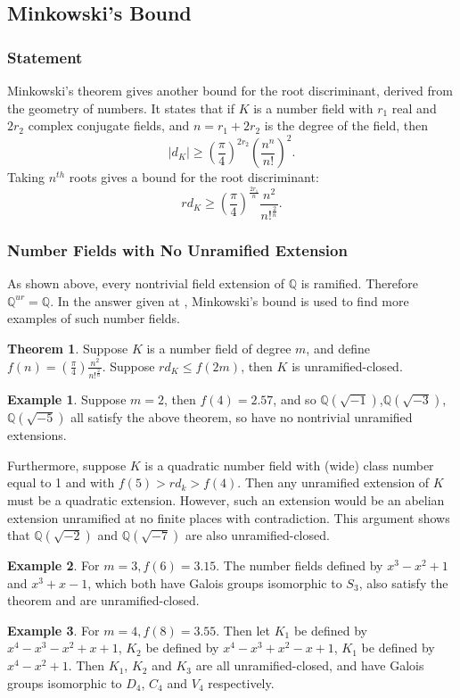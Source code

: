 \documentclass[12pt]{extarticle}
\newcommand{\Q}{\mathbb{Q}}
\newcommand{\<}{\langle}
\renewcommand{\>}{\rangle}
\theoremstyle{definition}
\newtheorem{theorem}{Theorem}
\newtheorem*{example}{Example}
\begin{document}
\subsection{Minkowski's Bound}
\subsubsection*{Statement}
Minkowski's theorem gives another bound for the root discriminant, derived from the geometry of numbers. It states that if $K$ is a number field with $r_1$ real and $2r_2$ complex conjugate fields, and $n=r_1+2r_2$ is the degree of the field, then 
\begin{equation}
|d_K| \geqslant \left( \frac{\pi}{4}\right)^{2r_2} \left( \frac{n^n}{n!}\right)^2.
\end{equation}Taking $n^{th}$ roots gives a bound for the root discriminant:
\begin{equation}
rd_K\geqslant (\frac{\pi}{4})^{\frac{2r_1}{n}}\frac{n^2}{n!^{\frac{2}{n}}}.
\end{equation} 

\subsubsection*{Number Fields with No Unramified Extension}
As shown above, every nontrivial field extension of $\Q$ is ramified. Therefore $\Q^{ur} = \Q$. In the answer given at \cite{CONRAD}, Minkowski's bound is used to find more examples of such number fields.
\begin{theorem}
Suppose $K$ is a number field of degree $m$, and define $f(n) = \left(\frac{\pi}{4}\right) \frac{n^2}{n!^{\frac{2}{n}}}$. Suppose $rd_K \leq f(2m)$, then $K$ is unramified-closed.
\end{theorem}
\begin{example}
Suppose $m=2$, then $f(4) = 2.57$, and so $\Q(\sqrt{-1})$,$\Q(\sqrt{-3})$,$\Q(\sqrt{-5})$ all satisfy the above theorem, so have no nontrivial unramified extensions.  
\end{example}
Furthermore, suppose $K$ is a quadratic number field with (wide) class number equal to 1 and with $f(5) > rd_k > f(4)$. Then any unramified extension of $K$ must be a quadratic extension. However, such an extension would be an abelian extension unramified at no finite places with contradiction. This argument shows that $\Q(\sqrt{-2})$ and $\Q(\sqrt{-7})$ are also unramified-closed. 

\begin{example} 

For $m=3, f(6) = 3.15$. The number fields defined by $x^3-x^2+1$ and $x^3+x-1$, which both have Galois groups isomorphic to $S_3$, also satisfy the theorem and are unramified-closed.
\end{example}
\begin{example} 

For $m=4, f(8) = 3.55$. Then let $K_1$ be defined by $x^4 - x^3 - x^2 + x + 1$, $K_2$ be defined by $x^4 - x^3 + x^2 - x + 1$, $K_1$ be defined by $x^4 - x^2 + 1$. Then $K_1$, $K_2$ and $K_3$ are all unramified-closed, and have Galois groups isomorphic to $D_4$, $C_4$ and $V_4$ respectively. 
\end{example}
\end{document}
